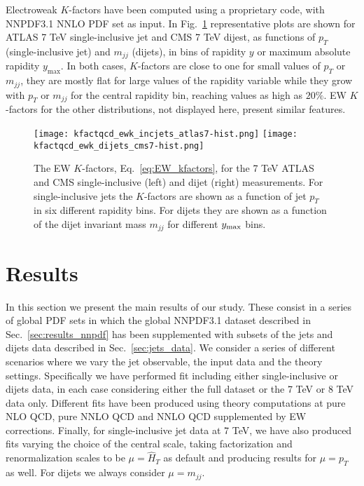 Electroweak $K$-factors have been computed using a proprietary code, with NNPDF3.1 NNLO PDF set as input.
In Fig.~\ref{fig:kfactewk_dijets7} representative plots are shown for ATLAS 7 TeV single-inclusive jet and CMS 7 TeV dijest,
as functions of $p_T$ (single-inclusive jet) and $m_{jj}$ (dijets), in bins of rapidity $y$
or maximum absolute rapidity $y_{\text{max}}$. In both cases, $K$-factors are close to one for small
values of $p_T$ or $m_{jj}$, they are mostly flat for large values of the rapidity variable while 
they grow with $p_T$ or $m_{jj}$  for the central rapidity bin, reaching values as high as $20\%$.
EW $K$-factors for the other distributions, not displayed here, present similar features.

\begin{figure}[!t]
    \centering
    \texttt{[image: kfactqcd\_ewk\_incjets\_atlas7-hist.png]}
    \texttt{[image: kfactqcd\_ewk\_dijets\_cms7-hist.png]}\\
    \caption{The EW $K$-factors, Eq.~\eqref{eq:EW_kfactors}, for the 7 TeV ATLAS and CMS
       single-inclusive (left) and dijet (right)  measurements. For 
       single-inclusive jets the $K$-factors are shown as a function of jet $p_T$ 
       in six different rapidity bins. For dijets they are shown as a function of 
       the dijet invariant mass $m_{jj}$ for different $y_{\rm max}$ bins.}
    \label{fig:kfactewk_dijets7}
\end{figure}





\section{Results}
In this section we present the main results of our study. These consist in a series of global PDF sets
in which the global NNPDF3.1 dataset described in Sec.~\ref{sec:results_nnpdf} has been supplemented with
subsets of the jets and dijets data described in Sec.~\ref{sec:jets_data}.
We consider a series of different scenarios where we vary the jet observable, the input data and the theory settings.
Specifically we have performed fit including either single-inclusive or dijets data, in each case considering
either the full dataset or the 7 TeV or 8 TeV data only. Different fits have been produced using 
theory computations at pure NLO QCD, pure NNLO QCD and NNLO QCD supplemented by EW corrections.
Finally, for single-inclusive jet data at 7 TeV, we have also produced fits varying the choice of the central scale,
taking factorization and renormalization scales to be $\mu = \hat{H}_T$ as default and
producing results for $\mu = p_T$ as well.
For dijets we always consider $\mu = m_{jj}$. 

